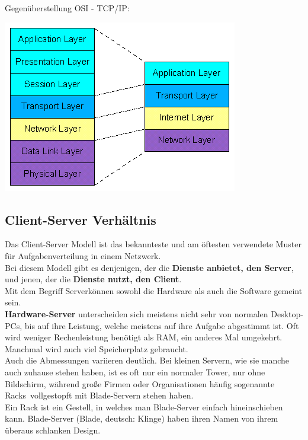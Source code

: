 \documentclass[12pt,a4paper]{report}
\begin{document}
\begin{onehalfspace}
Gegenüberstellung OSI - TCP/IP:\\
\begin{center}
\includegraphics[scale=0.7]{../docs/tarkes/pics/ositcpip.png}
\end{center}
\subsection{Client-Server Verhältnis}\label{ssec:client-server}
Das Client-Server Modell ist das bekannteste und am öftesten verwendete Muster für Aufgabenverteilung in einem Netzwerk.\\ 
Bei diesem Modell gibt es denjenigen, der die \textbf{Dienste anbietet, den Server}, und jenen, der die \textbf{Dienste nutzt, den Client}.\\

Mit dem Begriff \glqq Server\grqq können sowohl die Hardware als auch die Software gemeint sein.\\

\textbf{Hardware-Server} unterscheiden sich meistens nicht sehr von normalen Desktop-PCs, bis auf ihre Leistung, welche meistens auf ihre Aufgabe abgestimmt ist. Oft wird weniger Rechenleistung benötigt als RAM, ein anderes Mal umgekehrt. Manchmal wird auch viel Speicherplatz gebraucht.\\
Auch die Abmessungen variieren deutlich. Bei kleinen Servern, wie sie manche auch zuhause stehen haben, ist es oft nur ein normaler Tower, nur ohne Bildschirm, während große Firmen oder Organisationen häufig sogenannte \glqq Racks\grqq \ vollgestopft mit Blade-Servern stehen haben.\\
Ein Rack ist ein Gestell, in welches man Blade-Server einfach hineinschieben kann. Blade-Server (Blade, deutsch: Klinge) haben ihren Namen von ihrem überaus schlanken Design.\\


\end{onehalfspace}
\end{document}
